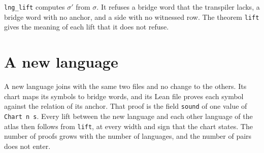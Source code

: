 \texttt{lng\_lift} computes $\sigma'$ from $\sigma$. It refuses a bridge word that the transpiler lacks, a bridge
word with no anchor, and a side with no witnessed row. The theorem \texttt{lift} gives the meaning of each lift
that it does not refuse.

\section{A new language}

A new language joins with the same two files and no change to the others. Its chart maps its symbols to bridge
words, and its Lean file proves each symbol against the relation of its anchor. That proof is the field
\texttt{sound} of one value of \texttt{Chart n s}. Every lift between the new language and each other language of
the atlas then follows from \texttt{lift}, at every width and sign that the chart states. The number of proofs grows
with the number of languages, and the number of pairs does not enter.
